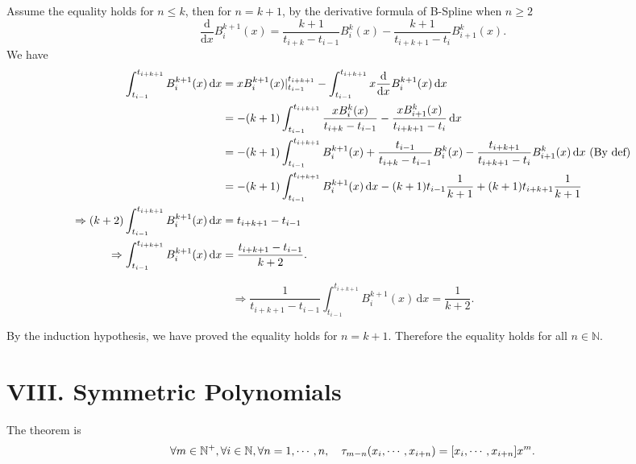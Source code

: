 \documentclass[a4paper]{article}
\begin{document}
Assume the equality holds for $n \leq k$, then for $n=k+1$, by the derivative formula of B-Spline when $n \geq 2$
\begin{equation}
    \frac{\mathrm{d} }{\mathrm{d} x} B_i^{k+1}(x) = \frac{k+1}{t_{i+k} - t_{i-1}} B_i^{k}(x) - \frac{k+1}{t_{i+k+1} - t_{i}} B_{i+1}^{k}(x).  
\end{equation}
We have
\begin{equation}
    \begin{aligned}
        \int_{t_{i-1}}^{t_{i+k+1}} B_i^{k+1}(x) \,\mathrm{d}x &= x B_i^{k+1}(x) \vert_{t_{i-1}}^{t_{i+k+1}} - \int_{t_{i-1}}^{t_{i+k+1}} x \frac{\mathrm{d} }{\mathrm{d} x} B_i^{k+1}(x) \,\mathrm{d}x \\ 
        &= -\qty(k+1) \int_{t_{i-1}}^{t_{i+k+1}} \frac{x B_i^k(x)}{t_{i+k}-t_{i-1}} - \frac{x B_{i+1}^k(x)}{t_{i+k+1}-t_{i}} \,\mathrm{d}x \\ 
        &= -\qty(k+1) \int_{t_{i-1}}^{t_{i+k+1}} B_{i}^{k+1}(x) + \frac{t_{i-1}}{t_{i+k}-t_{i-1}} B_i^k(x) - \frac{t_{i+k+1}}{t_{i+k+1}-t_{i}} B_{i+1}^k(x) \,\mathrm{d}x ~(\text{By def})\\
        &= -\qty(k+1) \int_{t_{i-1}}^{t_{i+k+1}} B_{i}^{k+1}(x) \, \mathrm{d}x - \qty(k+1) t_{i-1} \frac{1}{k+1} + \qty(k+1) t_{i+k+1} \frac{1}{k+1} \\
        \Rightarrow \qty(k+2) \int_{t_{i-1}}^{t_{i+k+1}} B_{i}^{k+1}(x) \, \mathrm{d}x &= t_{i+k+1} - t_{i-1} \\
        \Rightarrow \int_{t_{i-1}}^{t_{i+k+1}} B_{i}^{k+1}(x) \, \mathrm{d}x &= \frac{t_{i+k+1} - t_{i-1}}{k+2}.
    \end{aligned}
\end{equation}

\begin{equation}
    \Rightarrow \frac{1}{t_{i+k+1} - t_{i-1}} \int_{t_{i-1}}^{t_{i+k+1}} B_{i}^{k+1}(x) \, \mathrm{d}x = \frac{1}{k+2}.
\end{equation}

By the induction hypothesis, we have proved the equality holds for $n=k+1$. Therefore the equality holds for all $n \in \mathbb{N}$.


\section*{VIII. Symmetric Polynomials}

The theorem is 
\begin{equation}
    \forall m \in \mathbb{N}^+, \forall i \in \mathbb{N}, \forall n=1,\cdots,n, \quad \tau_{m-n} \qty(x_i,\cdots,x_{i+n}) = [x_i,\cdots,x_{i+n}]x^m.
\end{equation}
\end{document}
